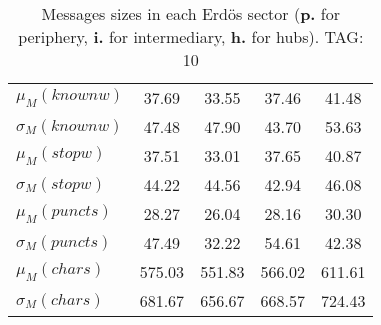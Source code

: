 \begin{table}[h!]
\begin{center}
\begin{tabular}{| l || c | c | c | c |}
$\mu_M(knownw)$ & 37.69  & 33.55  & 37.46  & 41.48 \\
$\sigma_M(knownw)$ & 47.48  & 47.90  & 43.70  & 53.63 \\\hline
$\mu_M(stopw)$ & 37.51  & 33.01  & 37.65  & 40.87 \\
$\sigma_M(stopw)$ & 44.22  & 44.56  & 42.94  & 46.08 \\\hline
$\mu_M(puncts)$ & 28.27  & 26.04  & 28.16  & 30.30 \\
$\sigma_M(puncts)$ & 47.49  & 32.22  & 54.61  & 42.38 \\\hline
$\mu_M(chars)$ & 575.03  & 551.83  & 566.02  & 611.61 \\
$\sigma_M(chars)$ & 681.67  & 656.67  & 668.57  & 724.43 \\\hline
\end{tabular}
\caption{Messages sizes in each Erd\"os sector ({{\bf p.}} for periphery, {{\bf i.}} for intermediary, {{\bf h.}} for hubs). TAG: 10}
\end{center}
\end{table}